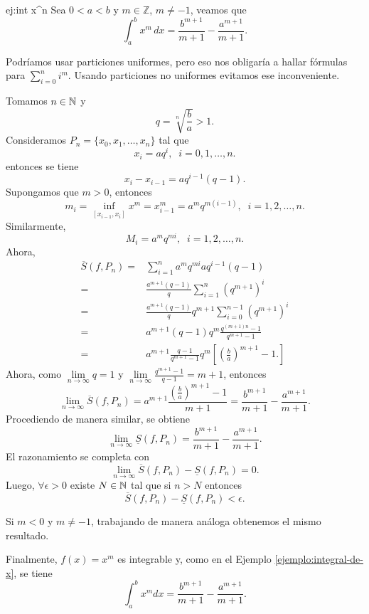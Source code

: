 \begin{ejemplo}{ej:int x^n} Sea $0< a<b$ y $m\in\mathbb{Z}$, $m\neq -1$,  veamos que 
\[
 \int_a^b x^m \,dx=\frac{b^{m+1}}{m+1}-\frac{a^{m+1}}{m+1}.
\]

\begin{demo}
Podr\'iamos usar particiones uniformes, pero eso nos obligar\'ia a hallar f\'ormulas para $\sum\limits_{i=0}^n{i^m}$. Usando particiones no uniformes evitamos ese inconveniente. 

Tomamos $n \in \mathbb{N}$ y 
\[
q=\sqrt[n]{\frac{b}{a}}>1.
\]
Consideramos $P_n=\{x_0,x_1,\ldots,x_n\}$ tal que
\[
x_i=aq^i, \;\;i=0,1,\ldots,n.
\]
entonces se tiene
\[
x_i-x_{i-1}=aq^{i-1}(q-1).
\]
Supongamos que $m>0$, entonces
\[
m_i=\inf\limits_{[x_{i-1},x_i]} x^m=x_{i-1}^m=a^m q^{m(i-1)}, \;\;i=1,2,\ldots,n.
\]
Similarmente, 
\[
M_i=a^mq^{mi},\;\;i=1,2,\ldots,n.
\]
Ahora, 
\[
\begin{split}
\overline{S}(f,P_n)=&
\sum\limits_{i=1}^n a^m q^{mi} aq^{i-1}(q-1)
\\
=&\frac{a^{m+1}(q-1)}{q}
\sum\limits_{i=1}^n (q^{m+1})^i
\\
=& \frac{a^{m+1}(q-1)}{q}q^{m+1}
\sum\limits_{i=0}^{n-1} (q^{m+1})^i
\\
=& a^{m+1}(q-1) q^m 
\frac{q^{(m+1)n }-1}{q^{m+1}-1}
\\
=&
a^{m+1}  \frac{q-1}{q^{m+1}-1} q^m \left[ \left(\frac{b}{a}\right)^{m+1}-1.\right]
\end{split}
\]
Ahora, como $\lim\limits_{n \to \infty} q=1$ y 
$
\lim\limits_{n \to \infty} \frac{q^{m+1}-1}{q-1}=m+1
$, entonces
\[
\lim\limits_{n \to \infty} \overline{S}(f,P_n)=a^{m+1}
\frac{\left(\frac{b}{a}\right)^{m+1}-1}{m+1}=\frac{b^{m+1}}{m+1}-\frac{a^{m+1}}{m+1}.
\]
Procediendo de manera similar, se obtiene
\[
\lim\limits_{n \to \infty} \underline{S}(f,P_n)=
\frac{b^{m+1}}{m+1}-\frac{a^{m+1}}{m+1}.
\]
El razonamiento se completa con 
\[
\lim\limits_{n \to \infty}
\overline{S}(f,P_n)-\underline{S}(f, P_n)=0.
\]
Luego, $\forall \epsilon>0$ existe $N\in \mathbb{N}$ tal que si $n>N$ entonces
\[\overline{S}(f,P_n)-\underline{S}(f, P_n)<\epsilon.\]

Si $m<0$  y $m \neq -1$, trabajando de manera an\'aloga obtenemos el mismo resultado. 

Finalmente, $f(x)=x^m$ es integrable  y, como en el Ejemplo \ref{ejemplo:integral-de-x}, se tiene
\[\int_a^b x^m dx=\frac{b^{m+1}}{m+1}-\frac{a^{m+1}}{m+1}.\]
\end{demo}
\end{ejemplo}

